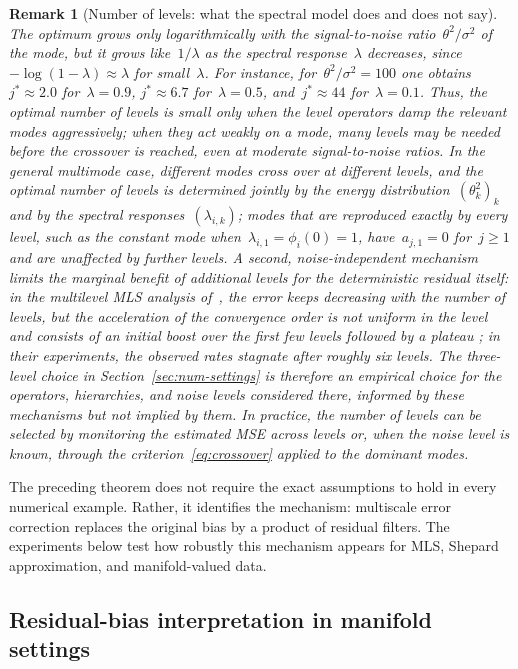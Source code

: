 \documentclass[12pt]{article}
\newtheorem{remark}{Remark}[section]
\begin{document}
\begin{remark}[Number of levels: what the spectral model does and does not say]
The optimum grows only logarithmically with the signal-to-noise ratio~$\theta^2/\sigma^2$ of the mode, but it grows like~$1/\lambda$ as the spectral response~$\lambda$ decreases, since~$-\log(1-\lambda)\approx\lambda$ for small~$\lambda$. For instance, for~$\theta^2/\sigma^2=100$ one obtains~$j^\ast\approx2.0$ for~$\lambda=0.9$, $j^\ast\approx6.7$ for~$\lambda=0.5$, and~$j^\ast\approx44$ for~$\lambda=0.1$. Thus, the optimal number of levels is small only when the level operators damp the relevant modes aggressively; when they act weakly on a mode, many levels may be needed before the crossover is reached, even at moderate signal-to-noise ratios. In the general multimode case, different modes cross over at different levels, and the optimal number of levels is determined jointly by the energy distribution~$(\theta_k^2)_k$ and by the spectral responses~$(\lambda_{i,k})$; modes that are reproduced exactly by every level, such as the constant mode when~$\lambda_{i,1}=\phi_i(0)=1$, have~$a_{j,1}=0$ for~$j\geq1$ and are unaffected by further levels. A second, noise-independent mechanism limits the marginal benefit of additional levels for the deterministic residual itself: in the multilevel MLS analysis of~\cite{durst2026improved}, the error keeps decreasing with the number of levels, but the acceleration of the convergence order is not uniform in the level and consists of an initial boost over the first few levels followed by a plateau \cite[Lemma~3.5 and the discussion following it]{durst2026improved}; in their experiments, the observed rates stagnate after roughly six levels. The three-level choice in Section~\ref{sec:num-settings} is therefore an empirical choice for the operators, hierarchies, and noise levels considered there, informed by these mechanisms but not implied by them. In practice, the number of levels can be selected by monitoring the estimated MSE across levels or, when the noise level is known, through the criterion~\eqref{eq:crossover} applied to the dominant modes.
\end{remark}

The preceding theorem does not require the exact assumptions to hold in every numerical example. Rather, it identifies the mechanism: multiscale error correction replaces the original bias by a product of residual filters. The experiments below test how robustly this mechanism appears for MLS, Shepard approximation, and manifold-valued data.

\subsection{Residual-bias interpretation in manifold settings}\label{sec:manifold}
\end{document}
